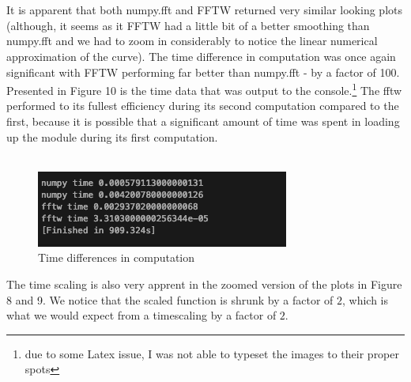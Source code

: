 \documentclass[12pt]{article}
\begin{document}
\\\\ It is apparent that both numpy.fft and FFTW returned very similar looking plots (although, it seems as it FFTW had a little bit of a better smoothing than numpy.fft and we had to zoom in considerably to notice the linear numerical approximation of the curve). The time difference in computation was once again significant with FFTW performing far better than numpy.fft - by a factor of 100. Presented in Figure 10 is the time data that was output to the console.\footnote{due to some Latex issue, I was not able to typeset the images to their proper spots} The fftw performed to its fullest efficiency during its second computation compared to the first, because it is possible that a significant amount of time was spent in loading up the module during its first computation. \\\\
\begin{figure}[h]
	\centering
	\includegraphics[scale=0.40]{2/timediff.png}
	\caption{Time differences in computation}
\end{figure}
The time scaling is also very apprent in the zoomed version of the plots in Figure 8 and 9. We notice that the scaled function is shrunk by a factor of $2$, which is what we would expect from a timescaling by a factor of $2$. 
\end{document}
